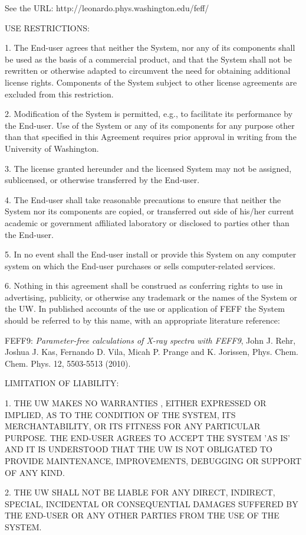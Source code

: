 \documentclass[11pt,oneside]{report} %
\begin{document}
\begin{latexonly}
 See the URL: http://leonardo.phys.washington.edu/feff/

 USE RESTRICTIONS:

 1. The End-user agrees that neither the System, nor any of its
 components shall be used as the basis of a commercial product, and
 that the System shall not be rewritten or otherwise adapted to
 circumvent the need for obtaining additional license rights.
 Components of the System subject to other license agreements are
 excluded from this restriction.

 2. Modification of the System is permitted, e.g., to facilitate
 its performance by the End-user. Use of the System or any of its
 components for any purpose other than that specified in this Agreement
 requires prior approval in writing from the University of Washington.

 3. The license granted hereunder and the licensed System may not be
 assigned, sublicensed, or otherwise transferred by the End-user.

 4. The End-user shall take reasonable precautions to ensure that
 neither the System nor its components are copied, or transferred out
 side of his/her current academic or government affiliated laboratory
 or disclosed to parties other than the End-user.

 5. In no event shall the End-user install or provide this System
 on any computer system on which the End-user purchases or sells
 computer-related services.

 6. Nothing in this agreement shall be construed as conferring rights
 to use in advertising, publicity, or otherwise any trademark or the
 names of the System or the UW. In published accounts of the use or
 application of FEFF the System should be referred to  by this name,
 with an appropriate literature reference:

 FEFF9: \emph{ Parameter-free calculations of X-ray spectra with FEFF9},
John J. Rehr, Joshua J. Kas, Fernando D. Vila, Micah P. Prange and K. Jorissen,
Phys. Chem. Chem. Phys. 12, 5503-5513 (2010).

 LIMITATION OF LIABILITY:

 1. THE UW MAKES NO WARRANTIES , EITHER EXPRESSED OR IMPLIED, AS TO
 THE CONDITION OF THE SYSTEM, ITS MERCHANTABILITY, OR ITS FITNESS FOR
 ANY PARTICULAR PURPOSE. THE END-USER AGREES TO ACCEPT THE SYSTEM
 'AS IS' AND IT IS UNDERSTOOD THAT THE UW IS NOT OBLIGATED TO PROVIDE
 MAINTENANCE, IMPROVEMENTS, DEBUGGING OR SUPPORT OF ANY KIND.

 2. THE UW SHALL NOT BE LIABLE FOR ANY DIRECT, INDIRECT, SPECIAL,
 INCIDENTAL OR CONSEQUENTIAL DAMAGES SUFFERED BY THE END-USER OR ANY
 OTHER PARTIES FROM THE USE OF THE SYSTEM.


\end{latexonly}
\end{document}
